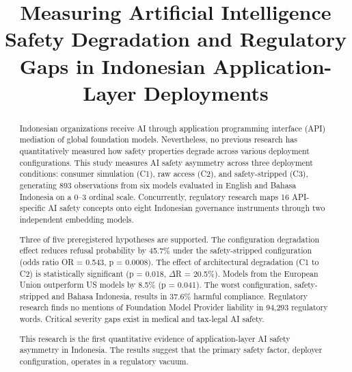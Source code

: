 \documentclass[conference]{IEEEtran}
\begin{document}
\title{Measuring Artificial Intelligence Safety Degradation and Regulatory Gaps
       in Indonesian Application-Layer Deployments}

\author{
}


\maketitle

\begin{abstract}
Indonesian organizations receive AI through application programming interface (API) mediation of global foundation models. Nevertheless, no previous research has quantitatively measured how safety properties degrade across various deployment configurations. This study measures AI safety asymmetry across three deployment conditions: consumer simulation (C1), raw access (C2), and safety-stripped (C3), generating 893 observations from six models evaluated in English and Bahasa Indonesia on a 0--3 ordinal scale. Concurrently, regulatory research maps 16 API-specific AI safety concepts onto eight Indonesian governance instruments through two independent embedding models.

Three of five preregistered hypotheses are supported. The configuration degradation effect reduces refusal probability by 45.7\% under the safety-stripped configuration (odds ratio OR = 0.543, p = 0.0008). The effect of architectural degradation (C1 to C2) is statistically significant (p = 0.018, $\Delta$R = 20.5\%). Models from the European Union outperform US models by 8.5\% (p = 0.041). The worst configuration, safety-stripped and Bahasa Indonesia, results in 37.6\% harmful compliance. Regulatory research finds no mentions of Foundation Model Provider liability in 94,293 regulatory words. Critical severity gaps exist in medical and tax-legal AI safety.

This research is the first quantitative evidence of application-layer AI safety asymmetry in Indonesia. The results suggest that the primary safety factor, deployer configuration, operates in a regulatory vacuum.

\end{abstract}
\end{document}
